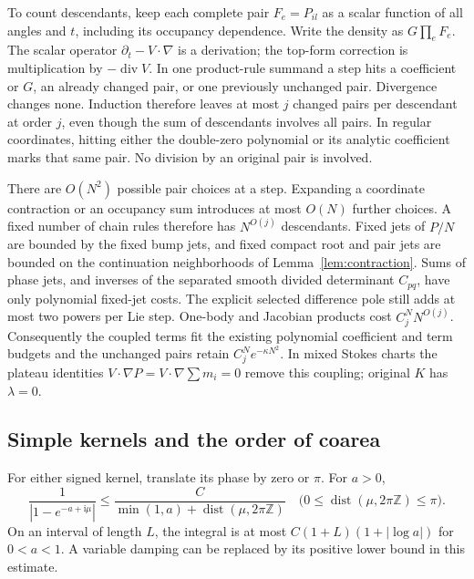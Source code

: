 \documentclass[11pt]{article}
\numberwithin{equation}{section}
\theoremstyle{definition}
\newcommand{\ii}{\mathrm i}
\newcommand{\Z}{\mathbb Z}
\begin{document}
To count descendants, keep each complete pair \(F_e=P_{il}\)
as a scalar function of all angles and \(t\), including its
occupancy dependence. Write the density as \(G\prod_e F_e\).
The scalar operator \(\partial_t-V\cdot\nabla\) is a derivation;
the top-form correction is multiplication by
\(-\operatorname{div}V\). In one product-rule summand a step
hits a coefficient or \(G\), an already changed pair, or one
previously unchanged pair. Divergence changes none. Induction
therefore leaves at most \(j\) changed pairs per descendant at
order \(j\), even though the sum of descendants involves all pairs.
In regular coordinates, hitting either the double-zero polynomial
or its analytic coefficient marks that same pair. No division
by an original pair is involved.

There are \(O(N^2)\) possible pair choices at a step. Expanding a
coordinate contraction or an occupancy sum introduces at most
\(O(N)\) further choices. A fixed number of chain rules therefore
has \(N^{O(j)}\) descendants. Fixed jets of \(P/N\) are bounded
by the fixed bump jets, and fixed compact root and pair jets are
bounded on the continuation neighborhoods of
Lemma~\ref{lem:contraction}. Sums of phase jets, and inverses of
the separated smooth divided determinant \(C_{pq}\), have only
polynomial fixed-jet costs. The explicit selected difference pole
still adds at most two powers per Lie step. One-body and Jacobian
products cost \(C_j^N N^{O(j)}\). Consequently the coupled terms
fit the existing polynomial coefficient and term budgets and
the unchanged pairs retain \(C_j^N e^{-\kappa N^2}\).
In mixed Stokes charts the plateau identities
\(V\cdot\nabla P=V\cdot\nabla\sum m_i=0\) remove this coupling;
original \(K\) has \(\lambda=0\).

\subsection{Simple kernels and the order of coarea}
For either signed kernel, translate its phase by zero or $\pi$. For \(a>0\),
\[
 \frac1{|1-e^{-a+\ii \mu}|}
 \le\frac C{\min(1,a)+\operatorname{dist}(\mu,2\pi\Z)}
 \quad\bigl(0\le\operatorname{dist}(\mu,2\pi\Z)\le\pi\bigr).
\]
On an interval of length \(L\), the integral is at most
\(C(1+L)(1+|\log a|)\) for \(0<a<1\). A variable damping can be
replaced by its positive lower bound in this estimate.
\end{document}

